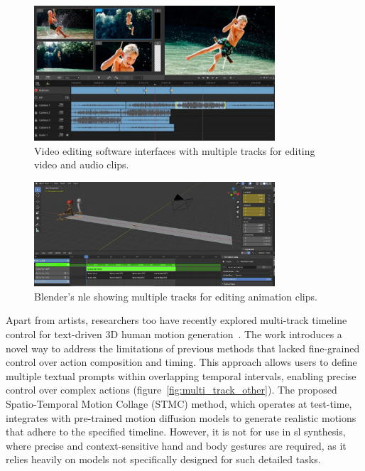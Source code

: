 \documentclass[../../main.tex]{subfiles}
\begin{document}
\begin{figure}
    \centering
    \includegraphics[width=0.8\textwidth]{chapters/multi_track/images/video_editing.png}
    \caption{Video editing software interfaces with multiple tracks for editing video and audio clips.}
    \label{fig:video_edit}
\end{figure}

\begin{figure}
    \centering
    \includegraphics[width=0.8\textwidth]{chapters/multi_track/images/nle_blender.png}
    \caption{Blender's \gls{nle} showing multiple tracks for editing animation clips.}
    \label{fig:nle_blender}
\end{figure}

Apart from artists, researchers too have recently explored multi-track timeline control for text-driven 3D human motion generation~\cite{petrovich24stmc}. The work introduces a novel way to address the limitations of previous methods that lacked fine-grained control over action composition and timing. This approach allows users to define multiple textual prompts within overlapping temporal intervals, enabling precise control over complex actions (figure~\ref{fig:multi_track_other}). The proposed Spatio-Temporal Motion Collage (STMC) method, which operates at test-time, integrates with pre-trained motion diffusion models to generate realistic motions that adhere to the specified timeline. However, it is not for use in \gls{sl} synthesis, where precise and context-sensitive hand and body gestures are required, as it relies heavily on models not specifically designed for such detailed tasks.
\end{document}
